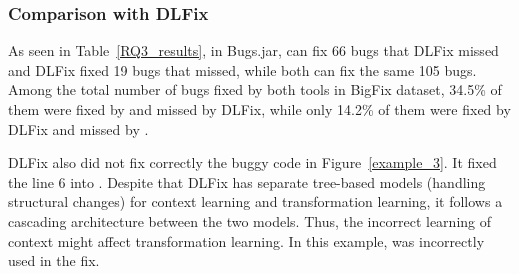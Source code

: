 \subsubsection{\bf Comparison with DLFix}

As seen in Table~\ref{RQ3_results}, in Bugs.jar, {\tool} can fix 66
bugs that DLFix missed and DLFix fixed 19 bugs that {\tool}
missed, while both can fix the same 105 bugs. Among the total
number of bugs fixed by both tools in BigFix dataset, 34.5\% of them
were fixed by {\tool} and missed by DLFix, while only 14.2\% of them
were fixed by DLFix and missed by {\tool}.

DLFix also did not fix correctly the buggy code in
Figure~\ref{example_3}. It fixed the line 6 into    \code{\%}
. Despite that DLFix has separate tree-based models
(handling structural changes) for context learning and transformation
learning, it follows a cascading architecture between the two
models. Thus, the incorrect learning of context might affect
transformation learning. In this example,  was
incorrectly used in the fix.













